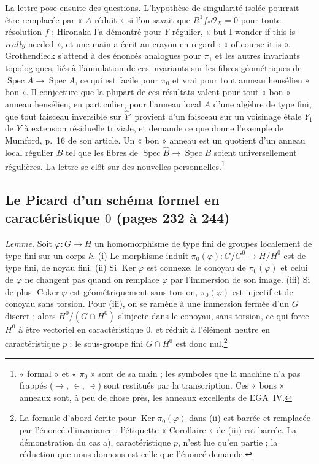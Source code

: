 \documentclass[11pt,a4paper]{article}
\begin{document}
La lettre pose ensuite des questions. L'hypothèse de singularité isolée
pourrait être remplacée par « $A$ réduit » si l'on savait que $R^1 f_*\mathcal{O}_X = 0$
pour toute résolution $f$ ; Hironaka l'a démontré pour $Y$ régulier, « but I
wonder if this is \emph{really} needed », et une main a écrit au crayon en
regard : « of course it is ». Grothendieck s'attend à des énoncés analogues
pour $\pi_1$ et les autres invariants topologiques, liés à l'annulation de ces
invariants sur les fibres géométriques de $\operatorname{Spec}\hat{A} \to \operatorname{Spec} A$,
ce qui est facile pour $\pi_0$ et vrai pour tout anneau hensélien « bon ». Il
conjecture que la plupart de ces résultats valent pour tout « bon » anneau
hensélien, en particulier, pour l'anneau local $A$ d'une algèbre de type fini,
que tout faisceau inversible sur $\hat{Y}'$ provient d'un faisceau sur un
voisinage étale $Y_1$ de $Y$ à extension résiduelle triviale, et demande ce
que donne l'exemple de Mumford, p.~16 de son article. Un « bon » anneau est un
quotient d'un anneau local régulier $B$ tel que les fibres de
$\operatorname{Spec}\hat{B} \to \operatorname{Spec} B$ soient universellement
régulières. La lettre se clôt sur des nouvelles personnelles.\footnote{« formal »
et « $\pi_0$ » sont de sa main ; les symboles que la machine n'a pas frappés
($\to$, $\in$, $\ni$) sont restitués par la transcription. Ces « bons »
anneaux sont, à peu de chose près, les anneaux excellents de EGA~IV.}

\subsection*{Le Picard d'un schéma formel en caractéristique $0$ (pages 232 à 244)}

\emph{Lemme.} Soit $\varphi \colon G \to H$ un homomorphisme de type fini de
groupes localement de type fini sur un corps $k$. (i) Le morphisme induit
$\pi_0(\varphi) \colon G/G^0 \to H/H^0$ est de type fini, de noyau fini.
(ii) Si $\operatorname{Ker}\varphi$ est connexe, le conoyau de $\pi_0(\varphi)$
et celui de $\varphi$ ne changent pas quand on remplace $\varphi$ par
l'immersion de son image. (iii) Si de plus $\operatorname{Coker}\varphi$ est
géométriquement sans torsion, $\pi_0(\varphi)$ est injectif et de conoyau sans
torsion. Pour (iii), on se ramène à une immersion fermée d'un $G$ discret ;
alors $H^0/(G \cap H^0)$ s'injecte dans le conoyau, sans torsion, ce qui force
$H^0$ à être vectoriel en caractéristique $0$, et réduit à l'élément neutre en
caractéristique $p$ ; le sous-groupe fini $G \cap H^0$ est donc
nul.\footnote{La formule d'abord écrite pour
$\operatorname{Ker}\pi_0(\varphi)$ dans (ii) est barrée et remplacée par
l'énoncé d'invariance ; l'étiquette « Corollaire » de (iii) est barrée. La
démonstration du cas a), caractéristique $p$, n'est lue qu'en partie ; la
réduction que nous donnons est celle que l'énoncé demande.}
\end{document}
